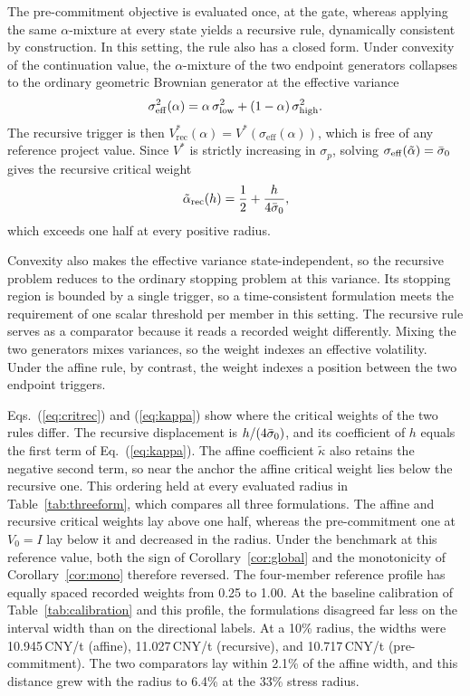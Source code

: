 The pre-commitment objective is evaluated once, at the gate, whereas applying the same $\alpha$-mixture at every state yields a recursive rule, dynamically consistent by construction. In this setting, the rule also has a closed form. Under convexity of the continuation value, the $\alpha$-mixture of the two endpoint generators collapses to the ordinary geometric Brownian generator at the effective variance
\begin{equation}
\sigma^{2}_{\mathrm{eff}}(\alpha)=\alpha\,\sigma_{\mathrm{low}}^{2}+(1-\alpha)\,\sigma_{\mathrm{high}}^{2}.
\label{eq:effvar}
\end{equation}
The recursive trigger is then $V^{*}_{\mathrm{rec}}(\alpha)=V^{*}(\sigma_{\mathrm{eff}}(\alpha))$, which is free of any reference project value. Since $V^{*}$ is strictly increasing in $\sigma_p$, solving $\sigma_{\mathrm{eff}}(\tilde{\alpha})=\bar{\sigma}_0$ gives the recursive critical weight
\begin{equation}
\tilde{\alpha}_{\mathrm{rec}}(h)=\frac{1}{2}+\frac{h}{4\bar{\sigma}_0},
\label{eq:critrec}
\end{equation}
which exceeds one half at every positive radius.

Convexity also makes the effective variance state-independent, so the recursive problem reduces to the ordinary stopping problem at this variance. Its stopping region is bounded by a single trigger, so a time-consistent formulation meets the requirement of one scalar threshold per member in this setting. The recursive rule serves as a comparator because it reads a recorded weight differently. Mixing the two generators mixes variances, so the weight indexes an effective volatility. Under the affine rule, by contrast, the weight indexes a position between the two endpoint triggers.

Eqs.~(\ref{eq:critrec}) and (\ref{eq:kappa}) show where the critical weights of the two rules differ. The recursive displacement is $h/(4\bar{\sigma}_0)$, and its coefficient of $h$ equals the first term of Eq.~(\ref{eq:kappa}). The affine coefficient $\tilde{\kappa}$ also retains the negative second term, so near the anchor the affine critical weight lies below the recursive one. This ordering held at every evaluated radius in Table~\ref{tab:threeform}, which compares all three formulations. The affine and recursive critical weights lay above one half, whereas the pre-commitment one at $V_0=I$ lay below it and decreased in the radius. Under the benchmark at this reference value, both the sign of Corollary~\ref{cor:global} and the monotonicity of Corollary~\ref{cor:mono} therefore reversed. The four-member reference profile has equally spaced recorded weights from 0.25 to 1.00. At the baseline calibration of Table~\ref{tab:calibration} and this profile, the formulations disagreed far less on the interval width than on the directional labels. At a 10\% radius, the widths were 10.945\,CNY/t (affine), 11.027\,CNY/t (recursive), and 10.717\,CNY/t (pre-commitment). The two comparators lay within 2.1\% of the affine width, and this distance grew with the radius to 6.4\% at the 33\% stress radius.

